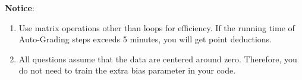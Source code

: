 \documentclass[a4paper, 12pt]{exam}
\begin{document}
\nocite{*}
\begin{flushleft}
\textbf{Notice}: \\
\begin{enumerate}
\item Use matrix operations other than loops for efficiency. If the running time of Auto-Grading steps exceeds 5 minutes, you will get point deductions.
\item All questions assume that the data are centered around zero. Therefore, you do not need to train the extra bias parameter in your code.
\end{enumerate}
\end{flushleft}

%
%
\end{document}

